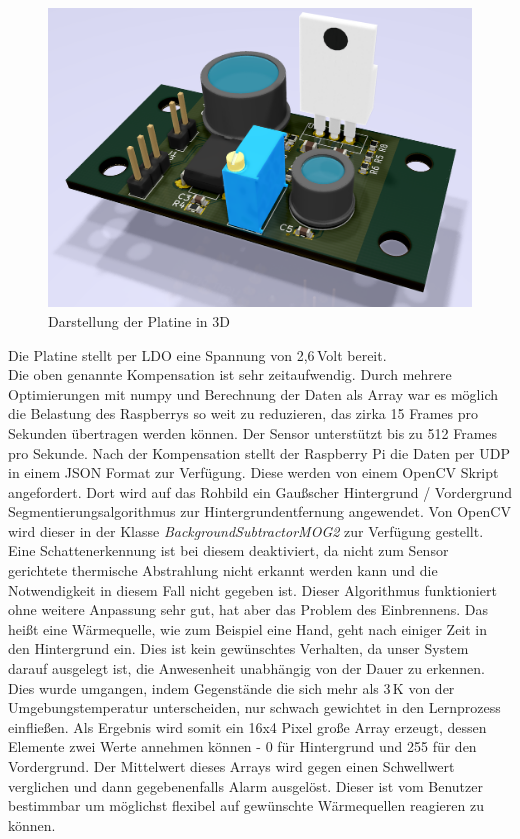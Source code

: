 \documentclass{sigchi}
\begin{document}
\begin{figure}
	\centering
	\includegraphics[width=\columnwidth]{fig/platine.png}
	\caption{Darstellung der Platine in 3D}
	\label{fig:platine}
\end{figure}
Die Platine stellt per \gls{LDO} eine Spannung von 2,6\,Volt bereit.\\
Die oben genannte Kompensation ist sehr zeitaufwendig. Durch mehrere Optimierungen mit numpy und Berechnung der Daten als Array war es möglich die Belastung des Raspberrys so weit zu reduzieren, das zirka 15 Frames pro Sekunden übertragen werden können. Der Sensor unterstützt bis zu 512 Frames pro Sekunde.
Nach der Kompensation stellt der Raspberry Pi die Daten per UDP in einem JSON Format zur Verfügung. Diese werden von einem OpenCV Skript angefordert. Dort wird auf das Rohbild ein Gaußscher Hintergrund / Vordergrund Segmentierungsalgorithmus zur Hintergrundentfernung angewendet. Von OpenCV wird dieser in der Klasse \emph{BackgroundSubtractorMOG2} zur Verfügung gestellt. Eine Schattenerkennung ist bei diesem deaktiviert, da nicht zum Sensor gerichtete thermische Abstrahlung nicht erkannt werden kann und die Notwendigkeit in diesem Fall nicht gegeben ist. Dieser Algorithmus funktioniert ohne weitere Anpassung sehr gut, hat aber das Problem des Einbrennens. Das heißt eine Wärmequelle, wie zum Beispiel eine Hand, geht nach einiger Zeit in den Hintergrund ein. Dies ist kein gewünschtes Verhalten, da unser System darauf ausgelegt ist, die Anwesenheit unabhängig von der Dauer zu erkennen. Dies wurde umgangen, indem Gegenstände die sich mehr als 3\,K von der Umgebungstemperatur unterscheiden, nur schwach gewichtet in den Lernprozess einfließen. Als Ergebnis wird somit ein 16x4 Pixel große Array erzeugt, dessen Elemente zwei Werte annehmen können - 0 für Hintergrund und 255 für den Vordergrund. Der Mittelwert dieses Arrays wird gegen einen Schwellwert verglichen und dann gegebenenfalls Alarm ausgelöst. Dieser ist vom Benutzer bestimmbar um möglichst flexibel auf gewünschte Wärmequellen reagieren zu können.
\end{document}

